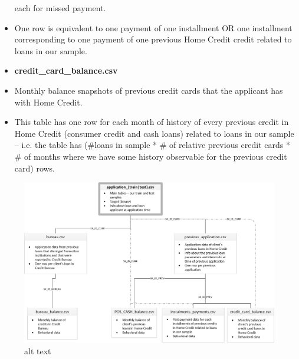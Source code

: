 \documentclass[11pt]{article}
\makeatletter
\def\maxwidth{\ifdim\Gin@nat@width>\linewidth\linewidth
    \else\Gin@nat@width\fi}
\let\Oldincludegraphics\includegraphics
\renewcommand{\includegraphics}[1]{\Oldincludegraphics[width=.8\maxwidth]{#1}}
\makeatother
\begin{document}
\begin{itemize}
  each for missed payment.
\item
  One row is equivalent to one payment of one installment OR one
  installment corresponding to one payment of one previous Home Credit
  credit related to loans in our sample.
\item
  \textbf{credit\_card\_balance.csv}
\item
  Monthly balance snapshots of previous credit cards that the applicant
  has with Home Credit.
\item
  This table has one row for each month of history of every previous
  credit in Home Credit (consumer credit and cash loans) related to
  loans in our sample -- i.e. the table has (\#loans in sample * \# of
  relative previous credit cards * \# of months where we have some
  history observable for the previous credit card) rows.
\end{itemize}

    \begin{figure}
\centering
\includegraphics{images/homecredit.png}
\caption{alt text}
\end{figure}
\end{document}
